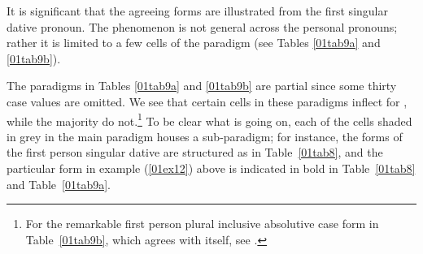 \documentclass[output=paper,colorlinks,citecolor=brown]{langscibook}
\begin{document}
It is significant that the agreeing forms are illustrated from the first singular dative pronoun. The phenomenon is not general across the personal pronouns; rather it is limited to a few cells of the paradigm (see Tables \ref{01tab9a} and \ref{01tab9b}).

The paradigms in Tables \ref{01tab9a} and \ref{01tab9b} are partial since some thirty case values are omitted. We see that certain cells in these paradigms inflect for , while the majority do not.\footnote{For the remarkable first person plural inclusive absolutive case form in Table~\ref{01tab9b}, which agrees with itself, see \citet[68--69]{corbett2006}.} To be clear what is going on, each of the cells shaded in grey in the main paradigm houses a sub‑paradigm; for instance, the forms of the first person singular dative are structured as in Table~\ref{01tab8}, and the particular form in example (\ref{01ex12}) above is indicated in bold in Table~\ref{01tab8} and Table~\ref{01tab9a}.
\end{document}
